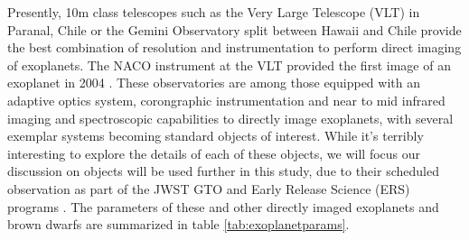Presently, 10m class telescopes such as the Very Large Telescope (VLT) in Paranal, Chile or the Gemini Observatory split between Hawaii and Chile provide the best combination of resolution and instrumentation to perform direct imaging of exoplanets.
The NACO instrument at the VLT provided the first image of an exoplanet in 2004 \parencite{Chauvin2004}.
These observatories are among those equipped with an adaptive optics system, corongraphic instrumentation and near to mid infrared imaging and spectroscopic capabilities to directly image exoplanets, with several exemplar systems becoming standard objects of interest.
While it's terribly interesting to explore the details of each of these objects, we will focus our discussion on objects will be used further in this study, due to their scheduled observation as part of the JWST GTO and Early Release Science (ERS) programs \parencite{Beichman2019}. 
The parameters of these and other directly imaged exoplanets and brown dwarfs are summarized in table \ref{tab:exoplanetparams}. 
